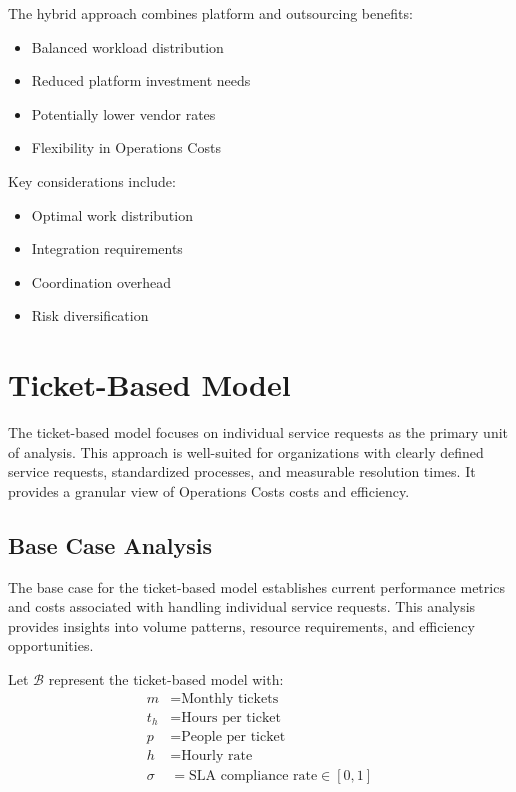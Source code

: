 \documentclass[12pt,a4paper]{article}
\newenvironment{definition}[1]
{\begin{mdframed}[style=definitionstyle,frametitle={Definition: #1}]}
{\end{mdframed}}
\newenvironment{explanation}
{\begin{mdframed}[style=explanationstyle,frametitle={Explanation}]}
{\end{mdframed}}
\begin{document}
\begin{explanation}
The hybrid approach combines platform and outsourcing benefits:
\begin{itemize}
    \item Balanced workload distribution
    \item Reduced platform investment needs
    \item Potentially lower vendor rates
    \item Flexibility in Operations Costs
\end{itemize}

Key considerations include:
\begin{itemize}
    \item Optimal work distribution
    \item Integration requirements
    \item Coordination overhead
    \item Risk diversification
\end{itemize}
\end{explanation}

\section{Ticket-Based Model}
The ticket-based model focuses on individual service requests as the primary unit of analysis. This approach is well-suited for organizations with clearly defined service requests, standardized processes, and measurable resolution times. It provides a granular view of Operations Costs costs and efficiency.

\subsection{Base Case Analysis}
The base case for the ticket-based model establishes current performance metrics and costs associated with handling individual service requests. This analysis provides insights into volume patterns, resource requirements, and efficiency opportunities.

\begin{definition}{Ticket Model Variables}
Let $\mathcal{B}$ represent the ticket-based model with:
\begin{align*}
    m &= \text{Monthly tickets} \\
    t_h &= \text{Hours per ticket} \\
    p &= \text{People per ticket} \\
    h &= \text{Hourly rate} \\
    \sigma &= \text{SLA compliance rate} \in [0,1]
\end{align*}
\end{definition}
\end{document}
